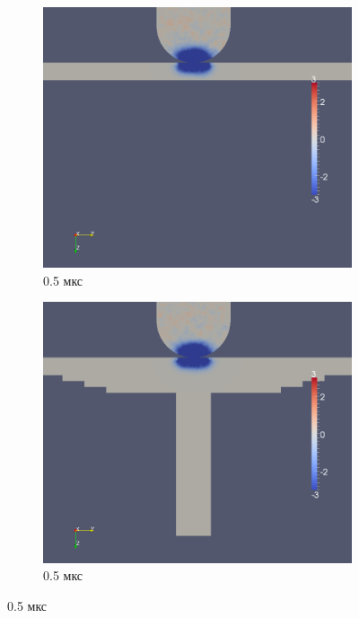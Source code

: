 \begin{figure}[htp]
\begin{subfigure}[b]{0.5\textwidth}
\centering
\includegraphics[width=\textwidth]{png/pkm-experiment/wing-only/wave/syy-0001.png}
\caption{0.5 мкс}
\end{subfigure}
\begin{subfigure}[b]{0.5\textwidth}
\centering
\includegraphics[width=\textwidth]{png/pkm-experiment/wing-stringer/wave/syy-0001.png}
\caption{0.5 мкс}
\end{subfigure}

\end{figure}
